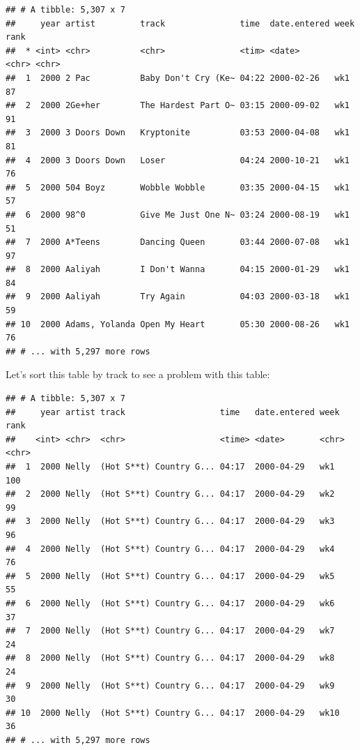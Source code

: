 \documentclass[12pt,]{book}
\newenvironment{Shaded}{\begin{snugshade}}{\end{snugshade}}
\newcommand{\KeywordTok}[1]{\textcolor[rgb]{0.13,0.29,0.53}{\textbf{#1}}}
\newcommand{\StringTok}[1]{\textcolor[rgb]{0.31,0.60,0.02}{#1}}
\newcommand{\OperatorTok}[1]{\textcolor[rgb]{0.81,0.36,0.00}{\textbf{#1}}}
\newcommand{\NormalTok}[1]{#1}
\theoremstyle{definition}
\theoremstyle{definition}
\theoremstyle{definition}
\theoremstyle{remark}
\begin{document}
\begin{verbatim}
## # A tibble: 5,307 x 7
##     year artist         track               time  date.entered week  rank 
##  * <int> <chr>          <chr>               <tim> <date>       <chr> <chr>
##  1  2000 2 Pac          Baby Don't Cry (Ke~ 04:22 2000-02-26   wk1   87   
##  2  2000 2Ge+her        The Hardest Part O~ 03:15 2000-09-02   wk1   91   
##  3  2000 3 Doors Down   Kryptonite          03:53 2000-04-08   wk1   81   
##  4  2000 3 Doors Down   Loser               04:24 2000-10-21   wk1   76   
##  5  2000 504 Boyz       Wobble Wobble       03:35 2000-04-15   wk1   57   
##  6  2000 98^0           Give Me Just One N~ 03:24 2000-08-19   wk1   51   
##  7  2000 A*Teens        Dancing Queen       03:44 2000-07-08   wk1   97   
##  8  2000 Aaliyah        I Don't Wanna       04:15 2000-01-29   wk1   84   
##  9  2000 Aaliyah        Try Again           04:03 2000-03-18   wk1   59   
## 10  2000 Adams, Yolanda Open My Heart       05:30 2000-08-26   wk1   76   
## # ... with 5,297 more rows
\end{verbatim}

Let's sort this table by track to see a problem with this table:

\begin{Shaded}
\end{Shaded}

\begin{verbatim}
## # A tibble: 5,307 x 7
##     year artist track                   time   date.entered week  rank 
##    <int> <chr>  <chr>                   <time> <date>       <chr> <chr>
##  1  2000 Nelly  (Hot S**t) Country G... 04:17  2000-04-29   wk1   100  
##  2  2000 Nelly  (Hot S**t) Country G... 04:17  2000-04-29   wk2   99   
##  3  2000 Nelly  (Hot S**t) Country G... 04:17  2000-04-29   wk3   96   
##  4  2000 Nelly  (Hot S**t) Country G... 04:17  2000-04-29   wk4   76   
##  5  2000 Nelly  (Hot S**t) Country G... 04:17  2000-04-29   wk5   55   
##  6  2000 Nelly  (Hot S**t) Country G... 04:17  2000-04-29   wk6   37   
##  7  2000 Nelly  (Hot S**t) Country G... 04:17  2000-04-29   wk7   24   
##  8  2000 Nelly  (Hot S**t) Country G... 04:17  2000-04-29   wk8   24   
##  9  2000 Nelly  (Hot S**t) Country G... 04:17  2000-04-29   wk9   30   
## 10  2000 Nelly  (Hot S**t) Country G... 04:17  2000-04-29   wk10  36   
## # ... with 5,297 more rows
\end{verbatim}
\end{document}
